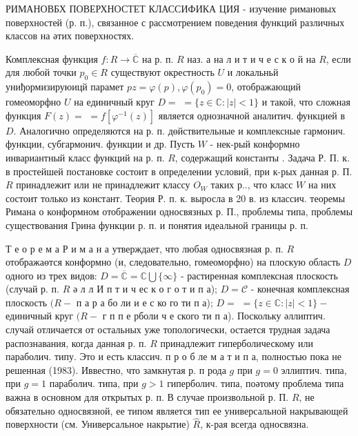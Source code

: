 \documentclass[10pt]{article}
\begin{document}
РИМАНОВБХ ПОВЕРХНОСТЕТ КЛАССИФИКА ЦИЯ - изучение римановых поверхностей (р. п.), связанное с рассмотрением поведения функций различных классов на әтих поверхностях.



Комплексная функция $f: R \rightarrow \overline{\mathbb{C}}$ на р. п. $R$ наз. а на л и т и ч е с к о й на $R$, если для любой точки $p_{0} \in R$ существуют окрестность $U$ и локальньй униђормизируюицй парамет $p z=\varphi(p), \varphi\left(p_{0}\right)=0$, отображающий гомеоморфно $U$ на единичный круг $D=$ $=\{z \in \mathbb{C}:|z|<1\}$ и такой, что сложная функция $F(z)=$ $=f\left[\varphi^{-1}(z)\right]$ является однозначной аналитич. функцией в $D$. Аналогично определяются на р. п. дөйствительные и комплексные гармонич. функции, субгармонич. функции и др. Пусть $W$ - нек-рый конформно инвариантный класс функций на р. п. $R$, содержащий константы . Задача Р. П. к. в простейшей постановке состоит в определении условий, при к-рых данная р. П. $R$ принадлежит или не принадлежит классу $O_{W}$ таких р.., что класс $W$ на них состоит только из констант. Теория Р. п. к. выросла в 20 в. из классич. теоремы Римана о конформном отображении односвязных р. П., проблемы типа, проблемы существования Грина функции р. п. и понятия идеальной границы р. п.



Т е о р е м а Р и м а н а утверждает, что любая односвязная р. п. $R$ отображаөтся конформно (и, следовательно, гомеоморфно) на плоскую область $D$ одного из трех видов: $D=\overline{\mathbb{C}}=\mathbb{C} \bigcup\{\infty\}$ - растиренная комплексная плоскость (случай р. п. $R$ ә л л И п т и ч ес к о г о т и п а); $D=\mathscr{C}$ - конечная комплексная плоскость $(R-$ п а р а бо ли и е с ко го ти п а); $D=$ $=\{z \in \mathbb{C}:|z|<1\}-$ единичный круг $(R-$ г п п е рболи ч е ского ти п а). Поскольку әллиптич. случай отличается от остальных уже топологически, остается трудная задача распознавания, когда данная р. п. $R$ принадлежит гиперболическому или параболич. типу. Это и есть классич. п р о б ле м а т и п а, полностью пока не решенная (1983). Иввестно, что замкнутая р. п рода $g$ при $g=0$ эллиптич. типа, при $g=1$ параболич. типа, при $g>1$ гиперболич. типа, поәтому проблема типа важна в основном для открытых р. п. В случае произвольной р. П. $R$, не обязательно односвязной, ее типом является тип ее универсальной накрывающей поверхности (см. Универсальное накрытие) $\widehat{R}$, к-рая всегда односвязна.
\end{document}
